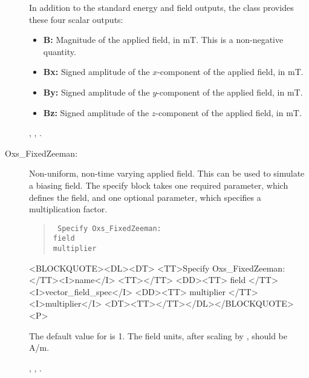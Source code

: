 \begin{description}
   In addition to the standard energy and field outputs, the
    class provides these four scalar outputs:
   \begin{itemize}
   \item \textbf{B:} Magnitude of the applied field, in
   mT.  This is a non-negative quantity.
   \item \textbf{Bx:} Signed amplitude of the $x$-component
   of the applied field, in mT.
   \item \textbf{By:} Signed amplitude of the $y$-component
   of the applied field, in mT.
   \item \textbf{Bz:} Signed amplitude of the $z$-component
   of the applied field, in mT.
   \end{itemize}

   \begin{ExampleMifs}
     , , .
   \end{ExampleMifs}

%
\item[Oxs\_FixedZeeman:]
   Non-uniform, non-time varying applied field.
   This can be used to simulate a biasing field.  The specify block
   takes one required parameter, which defines the field, and one
   optional parameter, which specifies a multiplication factor.
      \begin{latexonly}
      \begin{quote}\tt
      Specify Oxs\_FixedZeeman: \ocb\\
       \bi field \\
       \bi multiplier \\
      \ccb
      \end{quote}
      \end{latexonly}
      \begin{rawhtml}
      <BLOCKQUOTE><DL><DT>
      <TT>Specify Oxs_FixedZeeman:</TT><I>name</I> <TT>{</TT>
      <DD><TT> field </TT> <I>vector_field_spec</I>
      <DD><TT> multiplier </TT> <I>multiplier</I>
      <DT><TT>}</TT></DL></BLOCKQUOTE><P>
      \end{rawhtml}
   The default value for  is 1.  The field units,
   after scaling by , should be A/m.

   \begin{ExampleMifs}
     , , .
   \end{ExampleMifs}


\end{description}

